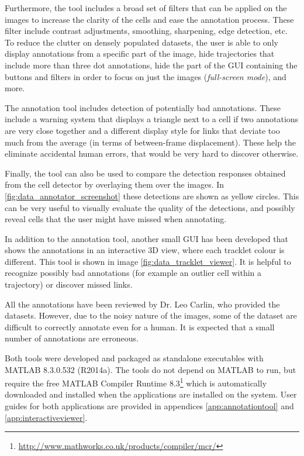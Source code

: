 						
		Furthermore, the tool includes a broad set of filters that can be applied on the images to increase the clarity of the cells and ease the annotation process. These filter include contrast adjustments, smoothing, sharpening, edge detection, etc. To reduce the clutter on densely populated datasets, the user is able to only display annotations from a specific part of the image, hide trajectories that include more than three dot annotations, hide the part of the GUI containing the buttons and filters in order to focus on just the images (\textit{full-screen mode}), and more.
		
		The annotation tool includes detection of potentially bad annotations. These include a warning system that displays a triangle next to a cell if two annotations are very close together and a different display style for links that deviate too much from the average (in terms of between-frame displacement). These help the eliminate accidental human errors, that would be very hard to discover otherwise.


		Finally, the tool can also be used to compare the detection responses obtained from the cell detector by overlaying them over the images. In \cref{fig:data_annotator_screenshot} these detections are shown as yellow circles. This can be very useful to visually evaluate the quality of the detections, and possibly reveal cells that the user might have missed when annotating.
		

		In addition to the annotation tool, another small GUI has been developed that shows the annotations in an interactive 3D view, where each tracklet colour is different. This tool is shown in image \cref{fig:data_tracklet_viewer}. It is helpful to recognize possibly bad annotations (for example an outlier cell within a trajectory) or discover missed links.
		
		All the annotations have been reviewed by Dr. Leo Carlin, who provided the datasets. However, due to the noisy nature of the images, some of the dataset are difficult to correctly annotate even for a human. It is expected that a small number of annotations are erroneous.
		
		Both tools were developed and packaged as standalone executables with MATLAB 8.3.0.532 (R2014a). The tools do not depend on MATLAB to run, but require the free MATLAB Compiler Runtime 8.3\footnote{\url{http://www.mathworks.co.uk/products/compiler/mcr/}} which is automatically downloaded and installed when the applications are installed on the system. User guides for both applications are provided in appendices \ref{app:annotationtool} and \ref{app:interactiveviewer}.
